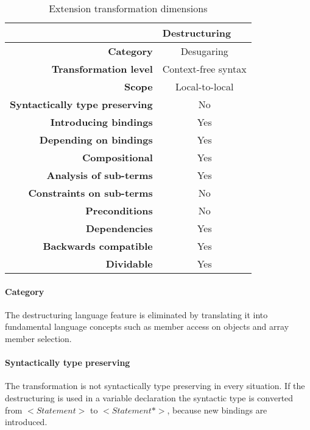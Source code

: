 \documentclass[10pt,a4paper]{article}
\begin{document}
\begin{table}[H]
\centering
\caption{Extension transformation dimensions}
\label{destructuring-table}
\begin{tabular}{@{}rc@{}}
\toprule
                                       & \multicolumn{1}{l}{\textbf{Destructuring}} \\ \midrule
\textbf{Category}                      & Desugaring
\\
\textbf{Transformation level}          & Context-free syntax                          \\
\textbf{Scope}                         & Local-to-local                               \\
\textbf{Syntactically type preserving} & No                                          \\
\textbf{Introducing bindings}          & Yes                                          \\%
\textbf{Depending on bindings}         & Yes                                           \\
\textbf{Compositional}                 & Yes                                          \\
\textbf{Analysis of sub-terms}          & Yes                                          \\
\textbf{Constraints on sub-terms}       & No                                           \\
\textbf{Preconditions}                 & No                                          \\
\textbf{Dependencies}                  & Yes                                           \\
\textbf{Backwards compatible}          & Yes                                          \\
\textbf{Dividable}                     & Yes                                           \\ \bottomrule
\end{tabular}
\end{table}

\paragraph{Category}
The destructuring language feature is eliminated by translating it into fundamental language concepts such as member access on objects and array member selection.

\paragraph{Syntactically type preserving}
The transformation is not syntactically type preserving in every situation. If the destructuring is used in a variable declaration the syntactic type is converted from $<Statement>$ to $<Statement*>$, because new bindings are introduced.
\end{document}

